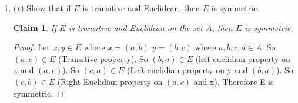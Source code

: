 \documentclass[11pt]{letter}
\newtheorem{claim}{Claim}
\theoremstyle{definition}
\begin{document}
\begin{description}
\begin{enumerate}
                          
					
			\item ($\star$) Show that if $E$ is transitive and Euclidean, then $E$ is symmetric.
                          \begin{claim}
                            If $E$ is transitive and Euclidean on the set $A$, then $E$ is symmetric.
                          \end{claim}
                         \begin{proof}
                            Let $x,y\in E$ where $x=(a,b)$ $y=(b,c)$ where $a,b,c,d\in A$. So $(a,c)\in E$ (Transitive property). So $(b,a)\in E$ (left euclidian property on x and $(a,c)$). So $(c,a)\in E$ (Left euclidian property on y and $(b,a)$). So $(c,b)\in E$ (Right Euclidian property on $(a,c)$ and x). Therefore E is symmetric.  
                          \end{proof}
                          
                          
			
\end{enumerate}

\end{description}
\end{document}
